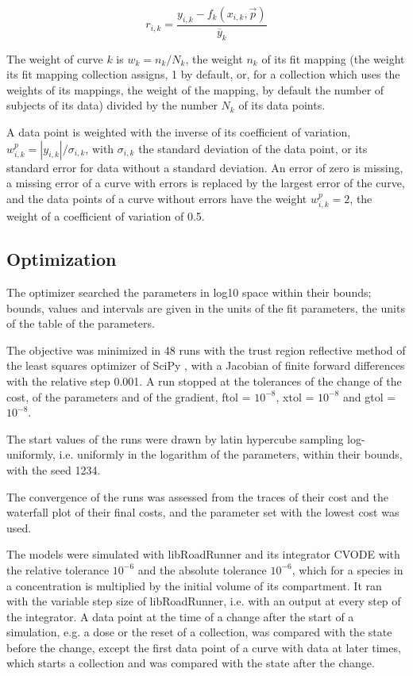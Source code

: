 \documentclass{article}
\begin{document}
\begin{equation}
r_{i,k} = \frac{y_{i,k} - f_k(x_{i,k}, \vec{p})}{\overline{y}_k}
\end{equation}

The weight of curve $k$ is $w_k = n_k / N_k$, the weight $n_k$ of its fit mapping (the weight its fit mapping collection assigns, 1 by default, or, for a collection which uses the weights of its mappings, the weight of the mapping, by default the number of subjects of its data) divided by the number $N_k$ of its data points.

A data point is weighted with the inverse of its coefficient of variation, $w^{p}_{i,k} = |y_{i,k}| / \sigma_{i,k}$, with $\sigma_{i,k}$ the standard deviation of the data point, or its standard error for data without a standard deviation. An error of zero is missing, a missing error of a curve with errors is replaced by the largest error of the curve, and the data points of a curve without errors have the weight $w^{p}_{i,k} = 2$, the weight of a coefficient of variation of 0.5.

\subsection{Optimization}

The optimizer searched the parameters in log10 space within their bounds; bounds, values and intervals are given in the units of the fit parameters, the units of the table of the parameters.

The objective was minimized in 48 runs with the trust region reflective method \cite{Branch1999} of the least squares optimizer of SciPy \cite{Virtanen2020}, with a Jacobian of finite forward differences with the relative step 0.001. A run stopped at the tolerances of the change of the cost, of the parameters and of the gradient, ftol = $10^{-8}$, xtol = $10^{-8}$ and gtol = $10^{-8}$.

The start values of the runs were drawn by latin hypercube sampling \cite{McKay1979} log-uniformly, i.e. uniformly in the logarithm of the parameters, within their bounds, with the seed 1234.

The convergence of the runs was assessed from the traces of their cost and the waterfall plot of their final costs, and the parameter set with the lowest cost was used.

The models were simulated with libRoadRunner \cite{Welsh2023} and its integrator CVODE \cite{Hindmarsh2005} with the relative tolerance $10^{-6}$ and the absolute tolerance $10^{-6}$, which for a species in a concentration is multiplied by the initial volume of its compartment. It ran with the variable step size of libRoadRunner, i.e. with an output at every step of the integrator. A data point at the time of a change after the start of a simulation, e.g. a dose or the reset of a collection, was compared with the state before the change, except the first data point of a curve with data at later times, which starts a collection and was compared with the state after the change.
\end{document}
